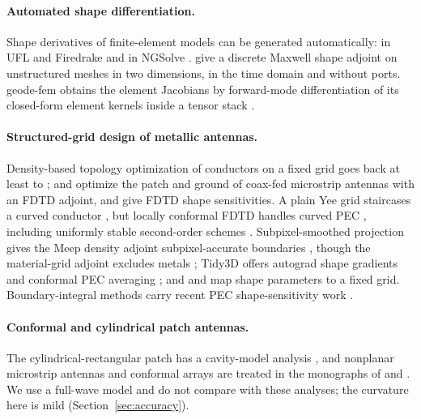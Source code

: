 \documentclass{anvil-paper}
\begin{document}
\paragraph{Automated shape differentiation.}
Shape derivatives of finite-element models can be generated automatically:
in UFL and Firedrake \citep{ham2019automated,dokken2020,paganini2021fireshape}
and in NGSolve \citep{gangl2021fully}. \citet{wang2011} give a discrete
Maxwell shape adjoint on unstructured meshes in two dimensions, in the time
domain and without ports. geode-fem obtains the element Jacobians by
forward-mode differentiation of its closed-form element kernels inside a
tensor stack \citep{burn}.

\paragraph{Structured-grid design of metallic antennas.}
Density-based topology optimization of conductors on a fixed grid goes back
at least to \citet{erentok2011topology}; \citet{hassan2014topology} and
\citet{hassan2014patch} optimize the patch and ground of coax-fed microstrip
antennas with an FDTD adjoint, and
\citet{nikolova2004sensitivity,nikolova2006scattering} give FDTD shape
sensitivities. A plain Yee grid staircases a curved conductor
\citep{cangellaris1991analysis,haggblad2014accuracy}, but locally conformal
FDTD handles curved PEC \citep{dey1997locally,mittra2000conformal},
including uniformly stable second-order schemes
\citep{zagorodnov2003uniformly,benkler2006new}. Subpixel-smoothed projection
gives the Meep density adjoint subpixel-accurate boundaries
\citep{hammond2025unifying,romano2026ssp2}, though the material-grid adjoint
excludes metals \citep{meepadjointdocs}; Tidy3D offers autograd shape
gradients and conformal PEC averaging \citep{tidy3dautograd}; and
\citet{hooten2025} and \citet{liu2024imagerep} map shape parameters to a
fixed grid. Boundary-integral methods carry recent PEC shape-sensitivity
work \citep{takahashi2025tdbie,arens2026tubular,balouchev2024balun}.

\paragraph{Conformal and cylindrical patch antennas.}
The cylindrical-rectangular patch has a cavity-model analysis
\citep{luk1989cylindrical}, and nonplanar microstrip antennas and conformal
arrays are treated in the monographs of \citet{wong1999nonplanar} and
\citet{josefsson2006conformal}. We use a full-wave model and do not compare
with these analyses; the curvature here is mild (Section~\ref{sec:accuracy}).
\end{document}
